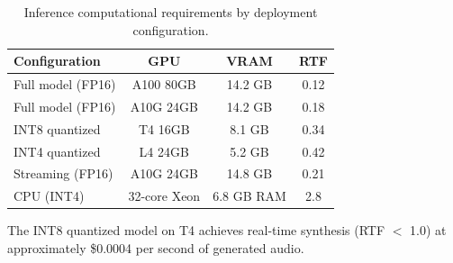 \documentclass[11pt,a4paper]{article}
\begin{document}
\begin{table}[h]
\centering
\caption{Inference computational requirements by deployment configuration.}
\label{tab:compute_req}
\begin{tabular}{lccc}
\toprule
\textbf{Configuration} & \textbf{GPU} & \textbf{VRAM} & \textbf{RTF} \\
\midrule
Full model (FP16) & A100 80GB & 14.2 GB & 0.12 \\
Full model (FP16) & A10G 24GB & 14.2 GB & 0.18 \\
INT8 quantized & T4 16GB & 8.1 GB & 0.34 \\
INT4 quantized & L4 24GB & 5.2 GB & 0.42 \\
Streaming (FP16) & A10G 24GB & 14.8 GB & 0.21 \\
CPU (INT4) & 32-core Xeon & 6.8 GB RAM & 2.8 \\
\bottomrule
\end{tabular}
\end{table}

The INT8 quantized model on T4 achieves real-time synthesis (RTF $<$ 1.0) at approximately \$0.0004 per second of generated audio.
\end{document}
